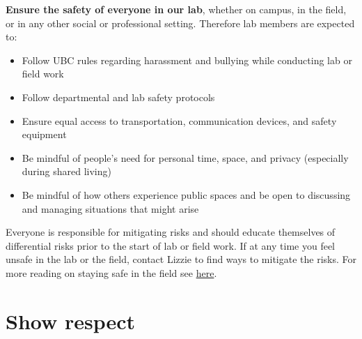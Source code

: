 \documentclass[11pt,a4paper,oneside]{article}
\begin{document}
\textbf{Ensure the safety of everyone in our lab}, whether on campus, in the field, or in any other social or professional setting. Therefore lab members are expected to:
\begin{itemize}
  \item Follow UBC rules regarding harassment and bullying while conducting lab or field work
  \item Follow departmental and lab safety protocols 
  \item Ensure equal access to transportation, communication devices, and safety equipment 
  \item Be mindful of people’s need for personal time, space, and privacy (especially during shared living)
  \item Be mindful of how others experience public spaces and be open to discussing and managing situations that might arise
\end{itemize}
  
\noindent
Everyone is responsible for mitigating risks and should educate themselves of differential risks prior to the start of lab or field work. If at any time you feel unsafe in the lab or the field, contact Lizzie to find ways to mitigate the risks. For more reading on staying safe in the field see \href{https://www.nature.com/articles/s41559-020-01328-5}{here}.

\section{Show respect}
\end{document}
